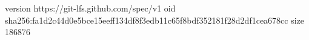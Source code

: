 version https://git-lfs.github.com/spec/v1
oid sha256:fa1d2c44d0e5bce15eeff134df8f3edb11c65f8bdf352181f28d2df1cea678cc
size 186876
